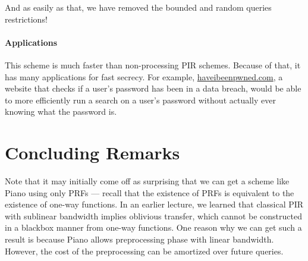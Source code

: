 {And as easily as that, we have removed the bounded and random queries restrictions!

\paragraph{Applications}
This scheme is much faster than non-processing PIR schemes. Because of that, it has many applications for fast secrecy. For example, \href{https://haveibeenpwned.com/}{haveibeenpwned.com}, a website that checks if a user's password has been in a data breach, would be able to more efficiently run a search on a user's password without actually ever knowing what the password is.
}


\section{Concluding Remarks}

Note that it may initially come off as surprising that we can get a scheme like Piano 
using only PRFs --- recall that the existence of PRFs is equivalent to
the existence of one-way functions. 
In an earlier lecture, we learned
that classical PIR with sublinear bandwidth implies oblivious transfer, 
which
cannot be constructed in a blackbox manner from one-way functions.
One reason why we can get such a result is because
Piano allows preprocessing phase
with linear bandwidth. However, the cost of the preprocessing can be  
amortized over future queries.



